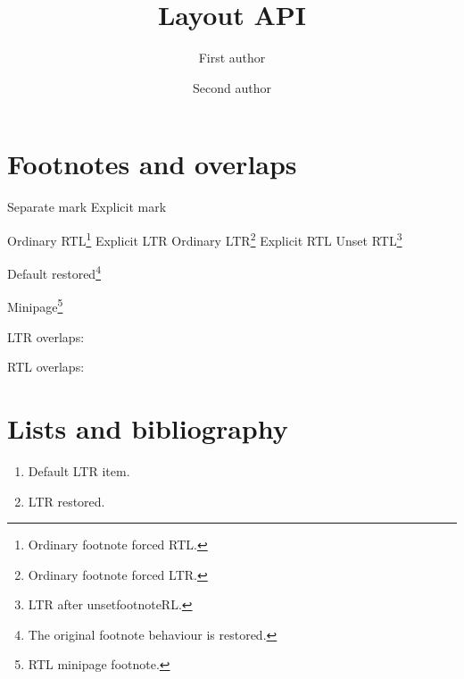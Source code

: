 \documentclass{article}
\title{Layout API}
\author{First author\LTRthanks{LTR title footnote.}%
    \and Second author\RTLthanks{RTL title footnote.}}
\date{}
\begin{document}
\maketitle

\section{Footnotes and overlaps}

Separate mark\footnotemark
{}
Explicit mark\footnotemark[7]

{\setfootnoteRL
    Ordinary RTL\footnote{Ordinary footnote forced RTL.}
    Explicit LTR
    \setfootnoteLR
    Ordinary LTR\footnote{Ordinary footnote forced LTR.}
    Explicit RTL
    \setfootnoteRL\unsetfootnoteRL
    Unset RTL\footnote{LTR after unsetfootnoteRL.}}

Default restored\footnote{The original footnote behaviour is restored.}

\medskip
\begin{minipage}{.8\linewidth}
    \setfootnoteRL
    Minipage\footnote{RTL minipage footnote.}

\end{minipage}

\LRfootnoterule

\bigskip
\noindent LTR overlaps:\quad
{}

\medskip
\noindent RTL overlaps:\quad
{}

\clearpage
\section{Lists and bibliography}

\begin{enumerate}
    \item Default LTR item.
    \item LTR restored.
\end{enumerate}
\end{document}
